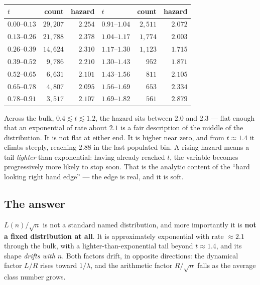 \documentclass[12pt,a4paper]{article}
\begin{document}
\begin{center}
\begin{tabular}{lrr@{\qquad}lrr}
\toprule
$t$ & count & hazard & $t$ & count & hazard \\
\midrule
$0.00$--$0.13$ & $29{,}207$ & $2.254$ & $0.91$--$1.04$ & $2{,}511$ & $2.072$ \\
$0.13$--$0.26$ & $21{,}788$ & $2.378$ & $1.04$--$1.17$ & $1{,}774$ & $2.003$ \\
$0.26$--$0.39$ & $14{,}624$ & $2.310$ & $1.17$--$1.30$ & $1{,}123$ & $1.715$ \\
$0.39$--$0.52$ & $9{,}786$  & $2.210$ & $1.30$--$1.43$ & $952$     & $1.871$ \\
$0.52$--$0.65$ & $6{,}631$  & $2.101$ & $1.43$--$1.56$ & $811$     & $2.105$ \\
$0.65$--$0.78$ & $4{,}807$  & $2.095$ & $1.56$--$1.69$ & $653$     & $2.334$ \\
$0.78$--$0.91$ & $3{,}517$  & $2.107$ & $1.69$--$1.82$ & $561$     & $2.879$ \\
\bottomrule
\end{tabular}
\end{center}

Across the bulk, $0.4 \lesssim t \lesssim 1.2$, the hazard sits between $2.0$ and $2.3$ --- flat enough that an exponential of rate about $2.1$ is a fair description of the middle of the distribution. It is not flat at either end. It is higher near zero, and from $t \approx 1.4$ it climbs steeply, reaching $2.88$ in the last populated bin. A rising hazard means a tail \emph{lighter} than exponential: having already reached $t$, the variable becomes progressively more likely to stop soon. That is the analytic content of the ``hard looking right hand edge'' --- the edge is real, and it is soft.

\subsection*{The answer}

\begin{tcolorbox}[colback=blue!6, colframe=blue!45!black, arc=2mm]
$L(n)/\sqrt{n}$ is not a standard named distribution, and more importantly it is \textbf{not a fixed distribution at all}. It is approximately exponential with rate $\approx 2.1$ through the bulk, with a lighter-than-exponential tail beyond $t \approx 1.4$, and its shape \emph{drifts with $n$}. Both factors drift, in opposite directions: the dynamical factor $L/R$ rises toward $1/\lambda$, and the arithmetic factor $R/\sqrt{n}$ falls as the average class number grows.
\end{tcolorbox}
\end{document}
